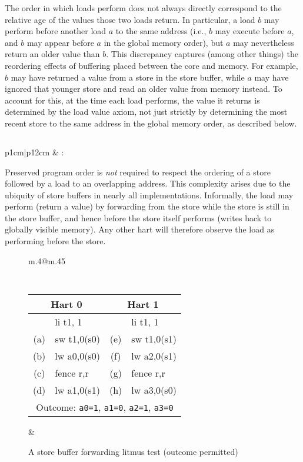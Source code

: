 The order in which loads perform does not always directly correspond to the relative age of the values those two loads return.
In particular, a load $b$ may perform before another load $a$ to the same address (i.e., $b$ may execute before $a$, and $b$ may appear before $a$ in the global memory order), but $a$ may nevertheless return an older value than $b$.
This discrepancy captures (among other things) the reordering effects of buffering placed between the core and memory.
For example, $b$ may have returned a value from a store in the store buffer, while $a$ may have ignored that younger store and read an older value from memory instead.
To account for this, at the time each load performs, the value it returns is determined by the load value axiom, not just strictly by determining the most recent store to the same address in the global memory order, as described below.

\subsection{}
\label{sec:memory:loadvalueaxiom}
\begin{tabular}{p{1cm}|p{12cm}} &
: \loadvalueaxiom
\end{tabular}

Preserved program order is {\em not} required to respect the ordering of a store followed by a load to an overlapping address.
This complexity arises due to the ubiquity of store buffers in nearly all implementations.
Informally, the load may perform (return a value) by forwarding from the store while the store is still in the store buffer, and hence before the store itself performs (writes back to globally visible memory).
Any other hart will therefore observe the load as performing before the store.

\begin{figure}[h!]
  \centering
  \begin{tabular}{m{.4\linewidth}@{\qquad}m{.45\linewidth}}
  {
    \tt\small
    \begin{tabular}{cl||cl}
    \multicolumn{2}{c}{Hart 0} & \multicolumn{2}{c}{Hart 1} \\
    \hline
          & li t1, 1    &     & li t1, 1    \\
      (a) & sw t1,0(s0) & (e) & sw t1,0(s1) \\
      (b) & lw a0,0(s0) & (f) & lw a2,0(s1) \\
      (c) & fence r,r   & (g) & fence r,r   \\
      (d) & lw a1,0(s1) & (h) & lw a3,0(s0) \\
      \hline
      \multicolumn{4}{c}{Outcome: {\tt a0=1}, {\tt a1=0}, {\tt a2=1}, {\tt a3=0}}
    \end{tabular}
  }
  &
  
  \end{tabular}
  \caption{A store buffer forwarding litmus test (outcome permitted)}
  \label{fig:litmus:storebuffer}
\end{figure}

